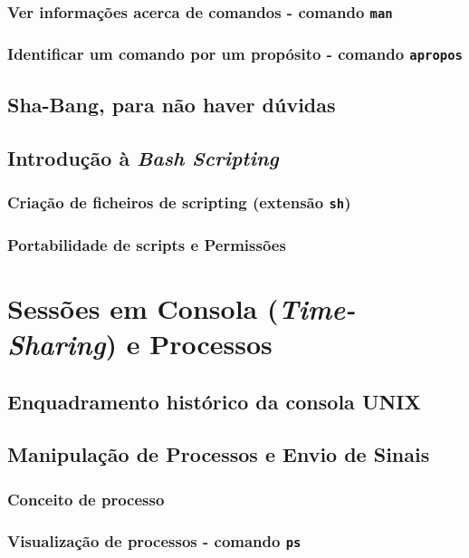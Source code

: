 \documentclass[a4paper, onecolumn, 10pt]{report}
\begin{document}
\subsection{Ver informações acerca de comandos - comando \texttt{man}}

\subsection{Identificar um comando por um propósito - comando \texttt{apropos}}

\section{Sha-Bang, para não haver dúvidas}

\section{Introdução à \textit{Bash Scripting}}

\subsection{Criação de ficheiros de scripting (extensão \texttt{sh})}

\subsection{Portabilidade de scripts e Permissões}

\chapter{Sessões em Consola (\textit{Time-Sharing}) e Processos}

\section{Enquadramento histórico da consola UNIX}

\section{Manipulação de Processos e Envio de Sinais}

\subsection{Conceito de processo}

\subsection{Visualização de processos - comando \texttt{ps}}
\end{document}
